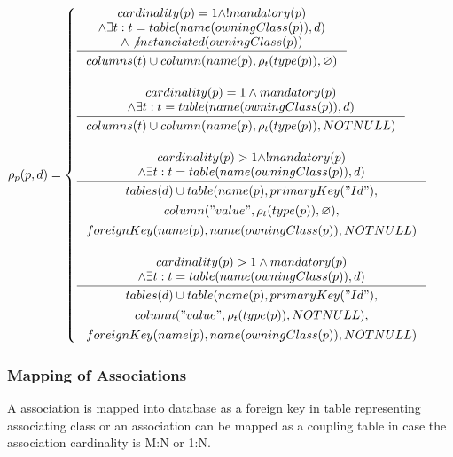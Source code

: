 \documentclass[11pt]{article}
\begin{document}
$\rho_p(p, d) = \begin{cases}
  \inference{cardinality(p) = 1 \wedge ! mandatory(p)
 \\ \wedge \exists t : t = table(name(owningClass(p)), d) 
 \\ \wedge \not instanciated(owningClass(p))
 }{\begin{gathered}
	  columns(t) \cup column(name(p), \rho_t(type(p)), \varnothing )
\end{gathered}
 } \\ \\

  \inference{cardinality(p) = 1 \wedge mandatory(p)
 \\ \wedge \exists t : t = table(name(owningClass(p)), d)}{\begin{gathered}
 	 columns(t) \cup column(name(p), \rho_t(type(p)), NOTNULL ) \\ 
\end{gathered}} 
\\ \\
 
 \inference{ cardinality(p) > 1 \wedge ! mandatory(p) \\ \wedge \exists t : t = table(name(owningClass(p)), d)}{\begin{gathered}tables(d) \cup  table(name(p), primaryKey("Id"), \\ column("value", \rho_t(type(p)), \varnothing), \\ foreignKey(name(p), name(owningClass(p)), NOTNULL) \\
\end{gathered}}
\\ \\

 \inference{ cardinality(p) > 1 \wedge mandatory(p) \\ \wedge \exists t : t = table(name(owningClass(p)), d) }{\begin{gathered} tables(d) \cup  table(name(p), primaryKey("Id"), \\ column("value", \rho_t(type(p)), NOTNULL), \\ foreignKey(name(p), name(owningClass(p)), NOTNULL)
	 \end{gathered}}
 \end{cases}$

\subsubsection{Mapping of Associations}
A association is mapped into database as a foreign key in table representing associating class or an association can be mapped as a coupling table in case the association cardinality is M:N or 1:N.
\end{document}
